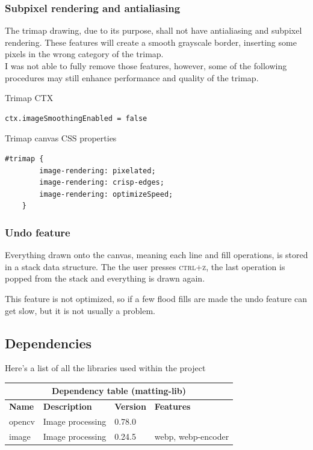 \documentclass[a4paper]{article}
\begin{document}
\pagebreak

\subsubsection{Subpixel rendering and antialiasing}

The trimap drawing, due to its purpose, shall not have antialiasing
and subpixel rendering. These features will create a smooth grayscale border,
inserting some pixels in the wrong category of the trimap. \\

I was not able to fully remove those features, however, some of the following
procedures may still enhance performance and quality of the trimap.

{\color{gray}Trimap CTX}
\begin{lstlisting}[style=JS, style=boxed]
    ctx.imageSmoothingEnabled = false
\end{lstlisting}

Trimap canvas CSS properties
\begin{lstlisting}[style=JS, style=boxed]
    #trimap {
        image-rendering: pixelated;
        image-rendering: crisp-edges;
        image-rendering: optimizeSpeed;
    }
\end{lstlisting}

\subsubsection{Undo feature}

Everything drawn onto the canvas, meaning each line and fill operations,
is stored in a stack data structure.
The the user presses \textsc{ctrl+z}, the last operation
is popped from the stack and everything is drawn again.

This feature is not optimized, so if a few flood fills are
made the undo feature can get slow, but it is not usually a problem.

\pagebreak

\subsection{Dependencies}

Here's a list of all the libraries used within the project

\bgroup{}
\def\arraystretch{1.5}
\begin{center}
    \begin{tabular}{ |p{2cm}|p{4cm}|p{1.5cm}|p{2cm}| }
        \hline
        \multicolumn{4}{|c|}{\textbf{Dependency table (matting-lib)}} \\
        \hline
        \textbf{Name} & \textbf{Description} & \textbf{Version} & \textbf{Features} \\
        \hline
        opencv & Image processing & 0.78.0 & \- \\
        \hline
        image & Image processing & 0.24.5 & webp, webp-encoder \\
        \hline
    \end{tabular}
\end{center}
\egroup{}
\end{document}
